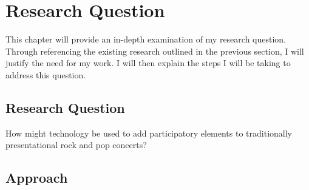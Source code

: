 \chapter{Research Question}

This chapter will provide an in-depth examination of my research question. Through referencing the existing research outlined in the previous section, I will justify the need for my work. I will then explain the steps I will be taking to address this question.

\section{Research Question}

How might technology be used to add participatory elements to traditionally presentational rock and pop concerts?


\section{Approach}